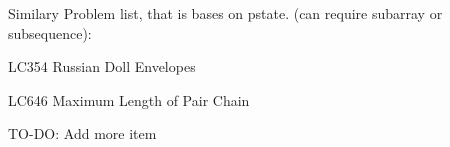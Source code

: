 \begin{pratice}
    Similary Problem list, that is bases on pstate. (can require subarray or subsequence):
    \begin{asparaenum}
        \item LC354 Russian Doll Envelopes
        \item LC646 Maximum Length of Pair Chain
        \item TO-DO: Add more item
    \end{asparaenum}
\end{pratice}